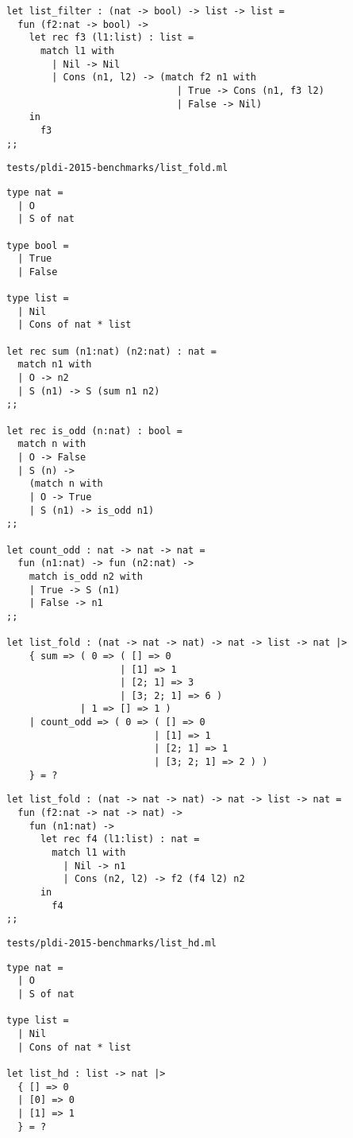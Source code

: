\begin{verbatim}
let list_filter : (nat -> bool) -> list -> list =
  fun (f2:nat -> bool) ->
    let rec f3 (l1:list) : list =
      match l1 with
        | Nil -> Nil
        | Cons (n1, l2) -> (match f2 n1 with
                              | True -> Cons (n1, f3 l2)
                              | False -> Nil)
    in
      f3
;;
\end{verbatim}

\noindent\large\texttt{tests/pldi-2015-benchmarks/list\_fold.ml}
\begin{verbatim}
type nat =
  | O
  | S of nat

type bool =
  | True
  | False

type list =
  | Nil
  | Cons of nat * list

let rec sum (n1:nat) (n2:nat) : nat =
  match n1 with
  | O -> n2
  | S (n1) -> S (sum n1 n2)
;;

let rec is_odd (n:nat) : bool =
  match n with
  | O -> False
  | S (n) ->
    (match n with
    | O -> True
    | S (n1) -> is_odd n1)
;;

let count_odd : nat -> nat -> nat =
  fun (n1:nat) -> fun (n2:nat) ->
    match is_odd n2 with
    | True -> S (n1)
    | False -> n1
;;

let list_fold : (nat -> nat -> nat) -> nat -> list -> nat |>
    { sum => ( 0 => ( [] => 0
                    | [1] => 1
                    | [2; 1] => 3
                    | [3; 2; 1] => 6 )
             | 1 => [] => 1 )
    | count_odd => ( 0 => ( [] => 0
                          | [1] => 1
                          | [2; 1] => 1
                          | [3; 2; 1] => 2 ) )
    } = ?
\end{verbatim}

\begin{verbatim}
let list_fold : (nat -> nat -> nat) -> nat -> list -> nat =
  fun (f2:nat -> nat -> nat) ->
    fun (n1:nat) ->
      let rec f4 (l1:list) : nat =
        match l1 with
          | Nil -> n1
          | Cons (n2, l2) -> f2 (f4 l2) n2
      in
        f4
;;
\end{verbatim}

\noindent\large\texttt{tests/pldi-2015-benchmarks/list\_hd.ml}
\begin{verbatim}
type nat =
  | O
  | S of nat

type list =
  | Nil
  | Cons of nat * list

let list_hd : list -> nat |>
  { [] => 0
  | [0] => 0
  | [1] => 1
  } = ?
\end{verbatim}

